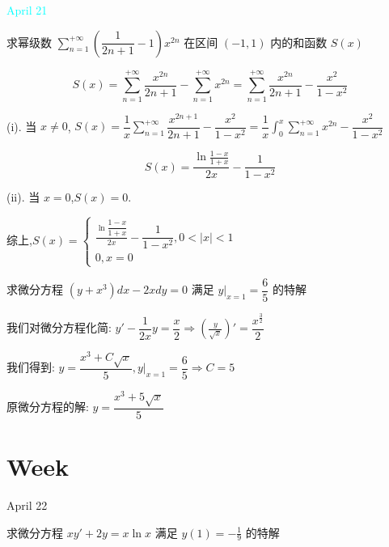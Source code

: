 \textcolor{cyan}{April 21}

\begin{example}[][Exam: 30.3.13]
	求幂级数 $\sum\limits_{n=1}^{+\infty}(\dfrac{1}{2n+1}-1)x^{2n}$ 在区间 $(-1,1)$ 内的和函数 $S(x)$
\end{example}

\begin{solution}
	
	$$S(x)=\sum\limits_{n=1}^{+\infty}\frac{x^{2n}}{2n+1}-\sum\limits_{n=1}^{+\infty}x^{2n}=\sum\limits_{n=1}^{+\infty}\frac{x^{2n}}{2n+1}-\frac{x^2}{1-x^2}$$
	
	(i). 当 $x\neq 0$, $S(x)=\dfrac{1}{x}\sum\limits_{n=1}^{+\infty}\dfrac{x^{2n+1}}{2n+1}-\dfrac{x^2}{1-x^2}=\dfrac{1}{x}\int_{0}^{x}\sum\limits_{n=1}^{+\infty}x^{2n}-\dfrac{x^2}{1-x^2}$
	
	$$S(x)=\frac{\ln\frac{1-x}{1+x}}{2x}-\frac{1}{1-x^2}$$
	
	(ii). 当 $x=0$,$S(x)=0$.
	
	综上,$S(x)=\left\lbrace 
	\begin{array}{l}
		\frac{\ln\dfrac{1-x}{1+x}}{2x}-\dfrac{1}{1-x^2},0<|x|<1\\
		0,x=0
	\end{array}
	\right.$
\end{solution}

\begin{example}[][Exam: 30.3.14]
	求微分方程 $(y+x^3)dx-2xdy=0$ 满足 $y\big|_{x=1}=\dfrac{6}{5}$ 的特解
\end{example}

\begin{solution}
	
	我们对微分方程化简: $y'-\dfrac{1}{2x}y=\dfrac{x}{2}\Rightarrow (\frac{y}{\sqrt{x}})'=\dfrac{x^{\frac{3}{2}}}{2}$
	
	我们得到: $y=\dfrac{x^3+C\sqrt{x}}{5},y|_{x=1}=\dfrac{6}{5}\Rightarrow C=5$
	
	原微分方程的解: $y=\dfrac{x^3+5\sqrt{x}}{5}$
\end{solution}


\section{Week }
\textcolor{purplea}{April 22}

\begin{example}[][Exam: 30.4.1]
	求微分方程 $xy'+2y=x\ln x$ 满足 $y(1)=-\frac{1}{9}$ 的特解
\end{example}

